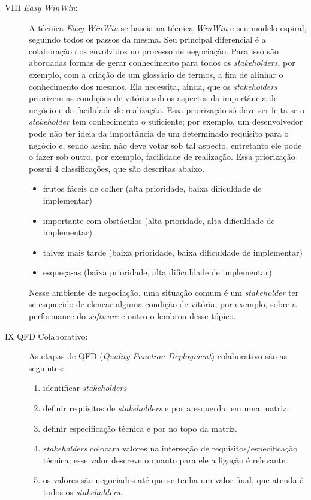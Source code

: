 \begin{description}
\item [VIII \textit{Easy WinWin}:]

A técnica \textit{Easy WinWin} se baseia na técnica \textit{WinWin} e seu modelo
espiral, seguindo todos os passos da mesma. Seu principal diferencial é a
colaboração dos envolvidos no processo de negociação. Para isso são abordadas formas de gerar conhecimento para todos os
\textit{stakeholders}, por exemplo, com a criação de um glossário de termos, a fim de
alinhar o conhecimento dos mesmos.
 Ela necessita, ainda, que os \textit{stakeholders} priorizem as condições de
 vitória sob os aspectos da importância de negócio e da facilidade de realização. Essa
 priorização só deve ser feita se o \textit{stakeholder} tem conhecimento o
 suficiente; por exemplo, um desenvolvedor pode não ter ideia da importância de um
 determinado requisito para o negócio e, sendo assim não deve votar sob tal
 aspecto, entretanto ele pode o fazer sob outro, por exemplo, facilidade de
 realização.
Essa priorização possui 4 classificações, que são descritas abaixo.

 \begin{itemize}
\item frutos fáceis de colher (alta prioridade, baixa dificuldade de implementar)
\item importante com obstáculos (alta prioridade, alta dificuldade de implementar)
\item talvez mais tarde (baixa prioridade, baixa dificuldade de implementar)
\item esqueça-as (baixa prioridade, alta dificuldade de implementar)
 \end{itemize}

Nesse ambiente de negociação, uma situação comum é um \textit{stakeholder} ter
se esquecido de elencar alguma condição de vitória, por exemplo, sobre a
performance do \textit{software} e outro o lembrou desse tópico.

\item [IX QFD Colaborativo:]

As etapas de QFD (\textit{Quality Function Deployment}) colaborativo são as
seguintes:

 \begin{enumerate}
\item identificar \textit{stakeholders}
\item definir requisitos de \textit{stakeholders} e por a esquerda, em uma
matriz.
\item definir especificação técnica e por no topo da matriz.
\item \textit{stakeholders} colocam valores na interseção de
requisitos/especificação técnica, esse valor descreve o quanto para ele a ligação é relevante.
\item os valores são negociados até que se tenha um valor final, que atenda à
todos os \textit{stakeholders}.
 \end{enumerate}


\end{description}
